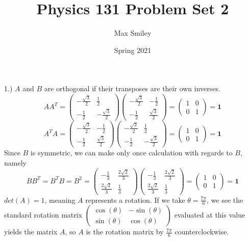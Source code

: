 \documentclass[12pt]{article}
\begin{document}
\title{Physics 131 Problem Set 2}
\author{Max Smiley}
\date{Spring 2021}
\maketitle

1.) $A$ and $B$ are orthogonal if their transposes are their own inverses.
$$AA^{T} = \begin{pmatrix} -\frac{\sqrt{3}}{2} & \frac{1}{2}\\ -\frac{1}{2} & -\frac{\sqrt{3}}{2}\end{pmatrix} \begin{pmatrix} -\frac{\sqrt{3}}{2} & -\frac{1}{2}\\ -\frac{1}{2} & \frac{\sqrt{3}}{2}\end{pmatrix} = \begin{pmatrix} 1 & 0 \\ 0 & 1 \end{pmatrix} = \textbf{1}$$
$$A^{T}A = \begin{pmatrix} -\frac{\sqrt{3}}{2} & -\frac{1}{2}\\ -\frac{1}{2} & \frac{\sqrt{3}}{2}\end{pmatrix} \begin{pmatrix} -\frac{\sqrt{3}}{2} & \frac{1}{2}\\ -\frac{1}{2} & -\frac{\sqrt{3}}{2}\end{pmatrix} = \begin{pmatrix} 1 & 0 \\ 0 & 1 \end{pmatrix} = \textbf{1}$$
Since $B$ is symmetric, we can make only once calculation with regards to $B$, namely
$$BB^{T} = B^{T}B = B^2 = \begin{pmatrix} -\frac{1}{3} & \frac{2 \sqrt{2}}{3}\\ \frac{2 \sqrt{2}}{3} & \frac{1}{3}\end{pmatrix} \begin{pmatrix} -\frac{1}{3} & \frac{2 \sqrt{2}}{3}\\ \frac{2 \sqrt{2}}{3} & \frac{1}{3}\end{pmatrix} = \begin{pmatrix}1 & 0\\ 0 & 1 \end{pmatrix} = \textbf{1}$$
$det(A) = 1$, meaning $A$ represents a rotation. If we take $\theta = \frac{7 \pi}{6}$, we see the standard rotation matrix $\begin{pmatrix} \cos(\theta) & -\sin(\theta)\\ \sin(\theta) & \cos(\theta) \end{pmatrix}$ evaluated at this value yields the matrix $A$, so $A$ is the rotation matrix by $\frac{7 \pi}{6}$ counterclockwise.\\
\end{document}
